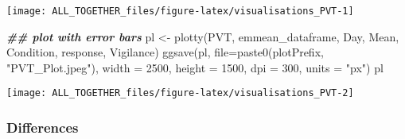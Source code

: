 \documentclass[
]{article}
\newenvironment{Shaded}{\begin{snugshade}}{\end{snugshade}}
\newcommand{\AttributeTok}[1]{\textcolor[rgb]{0.77,0.63,0.00}{#1}}
\newcommand{\DecValTok}[1]{\textcolor[rgb]{0.00,0.00,0.81}{#1}}
\newcommand{\DocumentationTok}[1]{\textcolor[rgb]{0.56,0.35,0.01}{\textbf{\textit{#1}}}}
\newcommand{\FunctionTok}[1]{\textcolor[rgb]{0.00,0.00,0.00}{#1}}
\newcommand{\NormalTok}[1]{#1}
\newcommand{\OtherTok}[1]{\textcolor[rgb]{0.56,0.35,0.01}{#1}}
\newcommand{\StringTok}[1]{\textcolor[rgb]{0.31,0.60,0.02}{#1}}
\begin{document}
\texttt{[image: ALL\_TOGETHER\_files/figure-latex/visualisations\_PVT-1]}

\begin{Shaded}
\begin{Highlighting}[]
\DocumentationTok{\#\# plot with error bars}
\NormalTok{pl }\OtherTok{\textless{}{-}} \FunctionTok{plotty}\NormalTok{(PVT, emmean\_dataframe, }\StringTok{\textquotesingle{}Day\textquotesingle{}}\NormalTok{,  }\StringTok{\textquotesingle{}Mean\textquotesingle{}}\NormalTok{, }\StringTok{\textquotesingle{}Condition\textquotesingle{}}\NormalTok{, }\StringTok{\textquotesingle{}response\textquotesingle{}}\NormalTok{, }\StringTok{\textquotesingle{}Vigilance\textquotesingle{}}\NormalTok{)}
\FunctionTok{ggsave}\NormalTok{(pl, }\AttributeTok{file=}\FunctionTok{paste0}\NormalTok{(plotPrefix, }\StringTok{"PVT\_Plot.jpeg"}\NormalTok{), }\AttributeTok{width =} \DecValTok{2500}\NormalTok{, }\AttributeTok{height =} \DecValTok{1500}\NormalTok{, }\AttributeTok{dpi =} \DecValTok{300}\NormalTok{, }\AttributeTok{units =} \StringTok{"px"}\NormalTok{)}
\NormalTok{pl}
\end{Highlighting}
\end{Shaded}

\texttt{[image: ALL\_TOGETHER\_files/figure-latex/visualisations\_PVT-2]}

\hypertarget{differences}{%
\subsubsection{Differences}\label{differences}}
\end{document}
